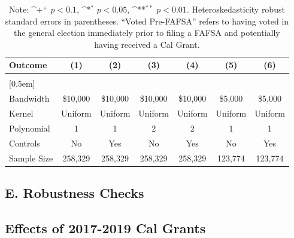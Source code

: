 \documentclass[12pt,letterpaper,oneside]{book}
\newcommand{\basepath}{g:/My Drive/Grad School}
\newcommand{\basepath}{basepath}
\begin{document}
    \begin{table}[h!]\centering
    \def\sym#1{\ifmmode^{#1}\else\(^{#1}\)\fi}
    \caption{Placebo Test of 2017-2019 Cal Grant Receipt on Pre-Treatment Voter Turnout\label{tab:placebo_prevturnout}}
    \begin{tabular}{l*{6}{c}}
        \hline\hline
        Outcome&\multicolumn{1}{c}{(1)}&\multicolumn{1}{c}{(2)}&\multicolumn{1}{c}{(3)}&\multicolumn{1}{c}{(4)}&\multicolumn{1}{c}{(5)}&\multicolumn{1}{c}{(6)}\\
        \hline
        &&&&&&\\

         [0.5em]


        &&&&&&\\

        \hline
        Bandwidth & \$10,000       &   \$10,000        &   \$10,000        &   \$10,000       &   \$5,000        &   \$5,000        \\
        Kernel&   Uniform      &   Uniform        &   Uniform        &   Uniform       &   Uniform       &   Uniform       \\
        Polynomial&   1       &   1        &   2        &   2       &   1       &   1       \\
        Controls&   No       &   Yes        &   No        &   Yes        &   No        &   Yes        \\
        Sample Size      &   258,329     &    258,329      &      258,329      &   258,329    &   123,774       &   123,774        \\
        \hline
    \end{tabular}
    \caption*{\footnotesize Note: \sym{+} \(p<0.1\), \sym{*} \(p<0.05\), \sym{**} \(p<0.01\). Heteroskedasticity robust standard errors in parentheses. ``Voted Pre-FAFSA'' refers to having voted in the general election immediately prior to filing a FAFSA and potentially having received a Cal Grant.}
\end{table}

\clearpage

\subsection*{E. Robustness Checks}\label{sec:appendixb}




\subsection{Effects of 2017-2019 Cal Grants}\label{sec:cal1719}
\end{document}
